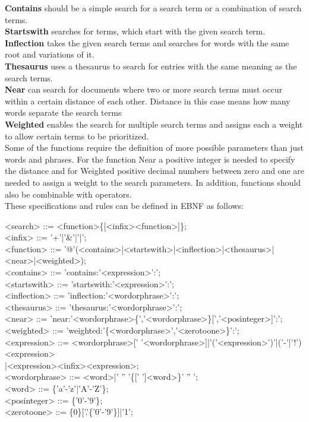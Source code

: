 \textbf{Contains} should be a simple search for a search term or a combination of search terms.\\
\textbf{Startswith} searches for terms, which start with the given search term.\\
\textbf{Inflection} takes the given search terms and searches for words with the same root and variations of it.\\
\textbf{Thesaurus} uses a thesaurus to search for entries with the same meaning as the search terms.\\
\textbf{Near} can search for documents where two or more search terms must occur within a certain distance of each other. Distance in this case means how many words separate the search terms\\
\textbf{Weighted} enables the search for multiple search terms and assigns each a weight to allow certain terms to be prioritized.\\
Some of the functions require the definition of more possible parameters than just words and phrases. For the function Near a positive integer is needed to specify the distance and for Weighted positive decimal numbers between zero and one are needed to assign a weight to the search parameters. In addition, functions should also be combinable with operators.\\
These specifications and rules can be defined in \ac{EBNF} as follows:
\begin{grammar}
    <search> ::= <function>\{[<infix><function>]\}; \\
    <infix> ::= '+'|'\&'|'|'; \\
    <function> ::= '@'(<contains>|<startswith>|<inflection>|<thesaurus>|<near>|<weighted>); \\

    <contains> ::= 'contains:'<expression>':'; \\
    <startswith> ::= 'startswith:'<expression>':'; \\
    <inflection> ::= 'inflection:'<wordorphrase>':'; \\
    <thesaurus> ::= 'thesaurus:'<wordorphrase>':'; \\
    <near> ::= 'near:'<wordorphrase>\{','<wordorphrase>\}[','<posinteger>]':'; \\
    <weighted> ::= 'weighted:'\{<wordorphrase>','<zerotoone>\}':'; \\

    <expression> ::= <wordorphrase>[' '<wordorphrase>]|'('<expression>')'|('-'|'!')<expression>\\
    \hspace*{\fill}|<expression><infix><expression>; \\
    <wordorphrase> ::= <word>|' '' '\{[' ']<word>\}' '' '; \\
    <word> ::= \{'a'-'z'|'A'-'Z'\}; \\
    <posinteger> ::= \{'0'-'9'\}; \\
    <zerotoone> ::= \{0\}['.'\{'0'-'9'\}]|'1';
\end{grammar}